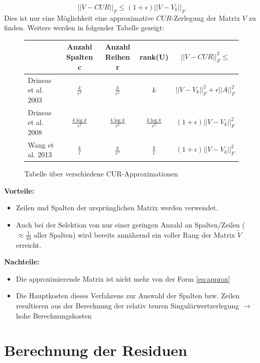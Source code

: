 \documentclass[12pt,a4paper,twoside]{article}
\begin{document}
		\begin{equation*}
			||V-CUR||_F\leq (1+\epsilon)||V-V_k||_F
		\end{equation*}
		Dies ist nur eine Möglichkeit eine approximative $CUR$-Zerlegung der Matrix $V$ zu finden. Weitere werden in 
		folgender Tabelle gezeigt: \newline
		\begin{figure}[h]
			\begin{tabular}{l||c|c|c|c}
		 		& Anzahl Spalten c & Anzahl Reihen r & rank(U) & $||V-CUR||_F^2\leq$ \\
		 		\hline \hline
		 		Drineas et al. 2003 \citep{drineas2003} & $\frac{k}{\epsilon^2}$ & $\frac{k}{\epsilon^2}$ & $k$ & $||V-V_k||_F^2+\epsilon||A||^2_F$ \\
		 		\hline
		 		Drineas et al. 2008 \citep{Drineas2009} & $\frac{k\log k}{\epsilon^2}$ & $\frac{k\log k}{\epsilon^4}$ & $\frac{k\log k}{\epsilon^2}$ & $(1+\epsilon)||V-V_k||^2_F$ \\
		 		\hline
		 		Wang et al. 2013 \citep{Wang2013}& $\frac{k}{\epsilon}$ & $\frac{k}{\epsilon^2}$ & $\frac{k}{\epsilon}$ & $(1+\epsilon)||V-V_k||^2_F$
			\end{tabular}
			\caption{Tabelle über verschiedene CUR-Approximationen}
		\end{figure}
		
		\textbf{Vorteile:}
		\begin{itemize}
			\item Zeilen und Spalten der ursprünglichen Matrix werden verwendet.
			\item Auch bei der Selektion von nur einer geringen Anzahl an Spalten/Zeilen ($\approx\frac{1}{10}$ aller Spalten) wird bereits annähernd ein voller Rang der Matrix $\tilde{V}$ erreicht.
		\end{itemize}
		\textbf{Nachteile:} 
		\begin{itemize}
			\item Die approximierende Matrix ist nicht mehr von der Form \ref{eq:approx}
			\item Die Hauptkosten dieses Verfahrens zur Auswahl der Spalten bzw. Zeilen resultieren aus der Berechnung der relativ teuren Singulärwertzerlegung $\rightarrow$ hohe Berechnungskosten
		\end{itemize}
		\newpage
\section{Berechnung der Residuen}
\end{document}
